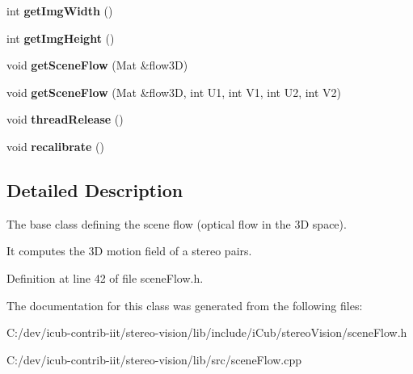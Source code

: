 \begin{DoxyCompactItemize}
\item 
int {\bfseries get\+Img\+Width} ()\label{classSceneFlow_a0844d30b0f1c10828f2144eb446e99fb}

\item 
int {\bfseries get\+Img\+Height} ()\label{classSceneFlow_a3c0fbe6df132fba94a0b24a8d1e90661}

\item 
void {\bfseries get\+Scene\+Flow} (Mat \&flow3D)\label{classSceneFlow_a8920f6b49c46d524fa543ac1e55c18e8}

\item 
void {\bfseries get\+Scene\+Flow} (Mat \&flow3D, int U1, int V1, int U2, int V2)\label{classSceneFlow_a82e1c079533882d4662fa29853d02f76}

\item 
void {\bfseries thread\+Release} ()\label{classSceneFlow_a999d87ea72266a0fc258b94a95fa48ec}

\item 
void {\bfseries recalibrate} ()\label{classSceneFlow_aecfc668fbb7d6800010abfe424a37aae}

\end{DoxyCompactItemize}


\subsection{Detailed Description}
The base class defining the scene flow (optical flow in the 3D space). 

It computes the 3D motion field of a stereo pairs. 

Definition at line 42 of file scene\+Flow.\+h.



The documentation for this class was generated from the following files\+:\begin{DoxyCompactItemize}
\item 
C\+:/dev/icub-\/contrib-\/iit/stereo-\/vision/lib/include/i\+Cub/stereo\+Vision/scene\+Flow.\+h\item 
C\+:/dev/icub-\/contrib-\/iit/stereo-\/vision/lib/src/scene\+Flow.\+cpp\end{DoxyCompactItemize}
